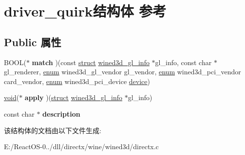 \hypertarget{structdriver__quirk}{}\section{driver\+\_\+quirk结构体 参考}
\label{structdriver__quirk}
\subsection*{Public 属性}
\begin{DoxyCompactItemize}
\item 
\mbox{\label{structdriver__quirk_a596972e81117bf19523591612c27a9a5}} 
B\+O\+OL($\ast$ {\bfseries match} )(const \hyperlink{interfacestruct}{struct} \hyperlink{structwined3d__gl__info}{wined3d\+\_\+gl\+\_\+info} $\ast$gl\+\_\+info, const char $\ast$gl\+\_\+renderer, \hyperlink{interfaceenum}{enum} wined3d\+\_\+gl\+\_\+vendor gl\+\_\+vendor, \hyperlink{interfaceenum}{enum} wined3d\+\_\+pci\+\_\+vendor card\+\_\+vendor, \hyperlink{interfaceenum}{enum} wined3d\+\_\+pci\+\_\+device \hyperlink{structdevice}{device})
\item 
\mbox{\label{structdriver__quirk_a0f6f53f4eb7a5a3e70bc0b34f60d797b}} 
\hyperlink{interfacevoid}{void}($\ast$ {\bfseries apply} )(\hyperlink{interfacestruct}{struct} \hyperlink{structwined3d__gl__info}{wined3d\+\_\+gl\+\_\+info} $\ast$gl\+\_\+info)
\item 
\mbox{\label{structdriver__quirk_ada6ca61e44424f090f00856a648c4afb}} 
const char $\ast$ {\bfseries description}
\end{DoxyCompactItemize}


该结构体的文档由以下文件生成\+:\begin{DoxyCompactItemize}
\item 
E\+:/\+React\+O\+S-\/0../dll/directx/wine/wined3d/directx.\+c\end{DoxyCompactItemize}
